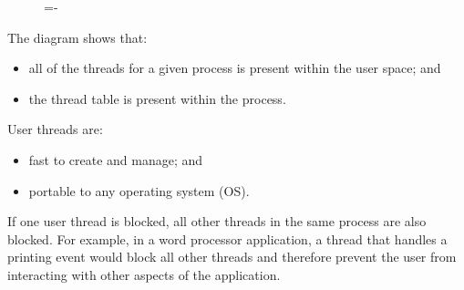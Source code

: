 \documentclass[a4paper]{systems-software}
\begin{document}
\begin{figure}[H]
  \lineskip=-\fboxrule
\end{figure}

The diagram shows that:
\begin{itemize}
	\item all of the threads for a given process is present within the user space; and
	\item the thread table is present within the process.
\end{itemize}

User threads are:
\begin{itemize}
	\item fast to create and manage; and
	\item portable to any operating system (OS).
\end{itemize}

If one user thread is blocked, all other threads in the same process are also blocked. For example, in a word processor application, a thread that handles a printing event would block all other threads and therefore prevent the user from interacting with other aspects of the application.
\end{document}
